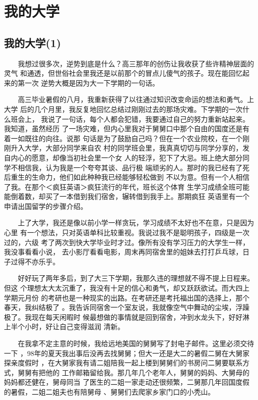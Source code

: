 \documentclass[12pt]{book}
\begin{document}
\chapter{我的大学}
\label{sec-4}
\section{我的大学(1)}
\label{sec-4-1}
　　我想过很多次，逆势到底是什么？高三那年的创伤让我收获了些许精神层面的灵气
和通透，但世俗社会里我还是以前那个的冒点儿傻气的孩子。现在能回忆起来的第一次
逆势大概是因为大一下学期的一句话。

　　高三毕业暑假的八月，我重新获得了以往通过知识改变命运的想法和勇气。上大学
后的几个月里，我反复地回忆总结过刚刚过去的那场灾难。下学期的一次什么班会上，
我说了一句话，每个人都会犯错，我要通过自己的努力重新站起来。我知道，虽然经历
了一场灾难，但内心里我对于舅舅口中那个自由的国度还是有着一如既往的向往。说那
句话是为了鼓励自己吗？但在一个农业院校，在一个刚刚升入大学，大部分同学来自农
村的同学班会里，我真真切切与同学分享的，发自内心的愿意，却像当初社会里一个女
人的轻浮，犯下了大忌。班上绝大部分同学不相信我，认为我是一个夸夸其谈、品行极
端顽劣的人。那时的我已经有了死后重生的生命力，他们如此种种我已经能够轻松做到
不以为意。但有一个人相信了我。在那个＜疯狂英语＞疯狂流行的年代，班长这个体育
生学习成绩全班可能能倒着数，却买了一本借到我们宿舍，辗转借到我手上。那期疯狂
英语里有一个申请出国留学的步骤介绍。

　　上了大学，我还是像以前小学一样贪玩，学习成绩不太好也不在意，只是因为心里
有一个想法，只对英语单科比较重视。我说过我不是聪明孩子，四级是一次过的，六级
考了两次到快大学毕业时才过。像所有没有学习压力的大学生一样，我没事看看小说，
去小影厅看看电影，周末再同宿舍里的姐妹去打打乒乓球，日子过得不亦乐乎。

　　好好玩了两年多后，到了大三下学期，我那久违的理想就不得不提上日程来。但这
个理想太大太沉重了，我没有十足的信心和勇气，却又跃跃欲试。而大四上学期元月份
的考研也是一种现实的出路。在考研还是考托福出国的选择上，那个春天，我纠结极了
。我告诉同宿舍一个室友说，我就像空气中舞动的尘埃，浮躁极了。我现在每天闲暇时
候最想做的事情就是回到宿舍，冲到水龙头下，好好淋上半个小时，好让自己变得滋润
清新。

　　在我拿不定主意的时候，我给远地美国的舅舅写了封电子邮件。这里必须交待一下
，98年的夏天我出事后没再去找舅舅；但大一还是大二的暑假二舅在大舅家探亲度假时
，在大舅家我有请二姐陪我一起上楼到舅舅们的书房问二舅要联系方式，舅舅有把他的
工作邮箱留给我。那几年几个老年人，舅舅的妈妈、大舅母的妈妈都还健在，舅母同当
了医生的二姐一家走动还很频繁，二舅那几年回国度假的暑假，二姐二姐夫也有陪舅母
、舅舅们去爬家乡家门口的小秃山。
\end{document}
